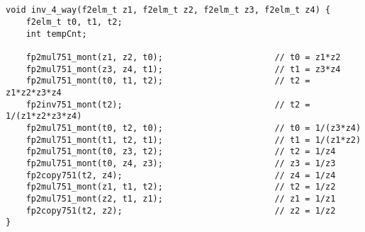 \subsection{}

\begin{lstlisting}
void inv_4_way(f2elm_t z1, f2elm_t z2, f2elm_t z3, f2elm_t z4) {
  	f2elm_t t0, t1, t2;
	int tempCnt;

    fp2mul751_mont(z1, z2, t0);                      // t0 = z1*z2
    fp2mul751_mont(z3, z4, t1);                      // t1 = z3*z4
    fp2mul751_mont(t0, t1, t2);                      // t2 = z1*z2*z3*z4
    fp2inv751_mont(t2);                              // t2 = 1/(z1*z2*z3*z4)
    fp2mul751_mont(t0, t2, t0);                      // t0 = 1/(z3*z4) 
    fp2mul751_mont(t1, t2, t1);                      // t1 = 1/(z1*z2) 
    fp2mul751_mont(t0, z3, t2);                      // t2 = 1/z4
    fp2mul751_mont(t0, z4, z3);                      // z3 = 1/z3
    fp2copy751(t2, z4);                              // z4 = 1/z4
    fp2mul751_mont(z1, t1, t2);                      // t2 = 1/z2
    fp2mul751_mont(z2, t1, z1);                      // z1 = 1/z1
    fp2copy751(t2, z2);                              // z2 = 1/z2
}
\end{lstlisting}

\subsection{}

